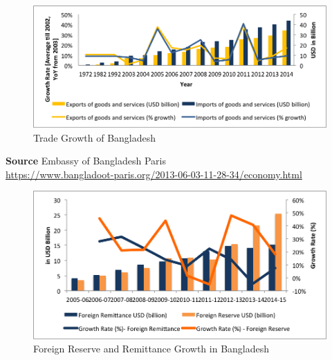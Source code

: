 \vspace{1.3cm}

\begin{figure}[h!]
    \centering
    \includegraphics[width=1.00\textwidth]{Figs/TG.png}
    \caption{Trade Growth of Bangladesh}
    \label{fig:mesh1}
\end{figure}

\vfill

\textbf{Source} Embassy of Bangladesh Paris \\ \url{https://www.bangladoot-paris.org/2013-06-03-11-28-34/economy.html}

\begin{figure}[h!]
    \centering
    \includegraphics[width=1.00\textwidth]{Figs/FRRG.png}
    \caption{Foreign Reserve and Remittance Growth in Bangladesh}
    \label{fig:mesh1}
\end{figure}

\vspace{1cm}

